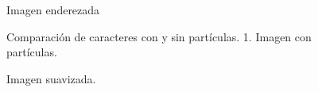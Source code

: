 		\begin{figure}[htbp]
			\centering
			\caption{Imagen enderezada}
			\label{fig: Enderezar}
		\end{figure}	
			  
		\begin{figure}[htbp]
			\centering
			\caption[Imagen con partículas]{Comparación de caracteres con y sin partículas. 1. Imagen con partículas.}
			\label{fig: Imagen con particulas}
		\end{figure}
		
		\begin{figure}[htbp]
			\centering
			\caption{Imagen suavizada.}
			\label{fig: Imagen suavizada}
		\end{figure}
		
